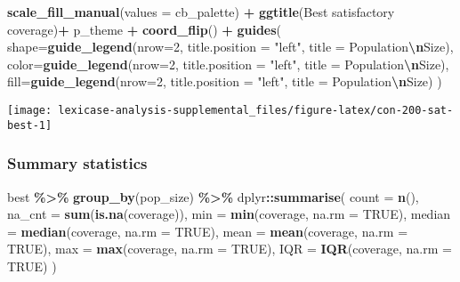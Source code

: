 \documentclass[
]{book}
\newenvironment{Shaded}{\begin{snugshade}}{\end{snugshade}}
\newcommand{\AttributeTok}[1]{\textcolor[rgb]{0.13,0.29,0.53}{#1}}
\newcommand{\ConstantTok}[1]{\textcolor[rgb]{0.56,0.35,0.01}{#1}}
\newcommand{\DecValTok}[1]{\textcolor[rgb]{0.00,0.00,0.81}{#1}}
\newcommand{\FunctionTok}[1]{\textcolor[rgb]{0.13,0.29,0.53}{\textbf{#1}}}
\newcommand{\NormalTok}[1]{#1}
\newcommand{\SpecialCharTok}[1]{\textcolor[rgb]{0.81,0.36,0.00}{\textbf{#1}}}
\newcommand{\StringTok}[1]{\textcolor[rgb]{0.31,0.60,0.02}{#1}}
\begin{document}
\begin{Shaded}
\begin{Highlighting}[]
  \FunctionTok{scale\_fill\_manual}\NormalTok{(}\AttributeTok{values =}\NormalTok{ cb\_palette) }\SpecialCharTok{+}
  \FunctionTok{ggtitle}\NormalTok{(}\StringTok{\textquotesingle{}Best satisfactory coverage\textquotesingle{}}\NormalTok{)}\SpecialCharTok{+}
\NormalTok{  p\_theme }\SpecialCharTok{+} \FunctionTok{coord\_flip}\NormalTok{() }\SpecialCharTok{+}
  \FunctionTok{guides}\NormalTok{(}
    \AttributeTok{shape=}\FunctionTok{guide\_legend}\NormalTok{(}\AttributeTok{nrow=}\DecValTok{2}\NormalTok{, }\AttributeTok{title.position =} \StringTok{"left"}\NormalTok{, }\AttributeTok{title =} \StringTok{\textquotesingle{}Population}\SpecialCharTok{\textbackslash{}n}\StringTok{Size\textquotesingle{}}\NormalTok{),}
    \AttributeTok{color=}\FunctionTok{guide\_legend}\NormalTok{(}\AttributeTok{nrow=}\DecValTok{2}\NormalTok{, }\AttributeTok{title.position =} \StringTok{"left"}\NormalTok{, }\AttributeTok{title =} \StringTok{\textquotesingle{}Population}\SpecialCharTok{\textbackslash{}n}\StringTok{Size\textquotesingle{}}\NormalTok{),}
    \AttributeTok{fill=}\FunctionTok{guide\_legend}\NormalTok{(}\AttributeTok{nrow=}\DecValTok{2}\NormalTok{, }\AttributeTok{title.position =} \StringTok{"left"}\NormalTok{, }\AttributeTok{title =} \StringTok{\textquotesingle{}Population}\SpecialCharTok{\textbackslash{}n}\StringTok{Size\textquotesingle{}}\NormalTok{)}
\NormalTok{  )}
\end{Highlighting}
\end{Shaded}

\texttt{[image: lexicase-analysis-supplemental\_files/figure-latex/con-200-sat-best-1]}

\hypertarget{summary-statistics-3}{%
\subsubsection{Summary statistics}\label{summary-statistics-3}}

\begin{Shaded}
\begin{Highlighting}[]
\NormalTok{best }\SpecialCharTok{\%\textgreater{}\%}
  \FunctionTok{group\_by}\NormalTok{(pop\_size) }\SpecialCharTok{\%\textgreater{}\%}
\NormalTok{  dplyr}\SpecialCharTok{::}\FunctionTok{summarise}\NormalTok{(}
    \AttributeTok{count =} \FunctionTok{n}\NormalTok{(),}
    \AttributeTok{na\_cnt =} \FunctionTok{sum}\NormalTok{(}\FunctionTok{is.na}\NormalTok{(coverage)),}
    \AttributeTok{min =} \FunctionTok{min}\NormalTok{(coverage, }\AttributeTok{na.rm =} \ConstantTok{TRUE}\NormalTok{),}
    \AttributeTok{median =} \FunctionTok{median}\NormalTok{(coverage, }\AttributeTok{na.rm =} \ConstantTok{TRUE}\NormalTok{),}
    \AttributeTok{mean =} \FunctionTok{mean}\NormalTok{(coverage, }\AttributeTok{na.rm =} \ConstantTok{TRUE}\NormalTok{),}
    \AttributeTok{max =} \FunctionTok{max}\NormalTok{(coverage, }\AttributeTok{na.rm =} \ConstantTok{TRUE}\NormalTok{),}
    \AttributeTok{IQR =} \FunctionTok{IQR}\NormalTok{(coverage, }\AttributeTok{na.rm =} \ConstantTok{TRUE}\NormalTok{)}
\NormalTok{  )}
\end{Highlighting}
\end{Shaded}
\end{document}
